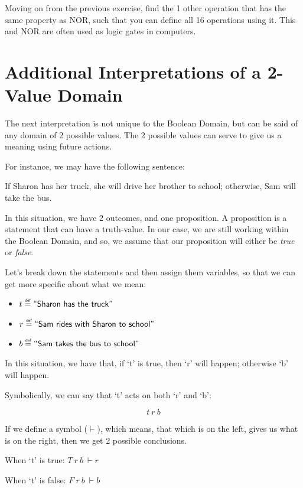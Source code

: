 \begin{exercise}
Moving on from the previous exercise, find the 1 other operation that has the same property as NOR, such that you can define all 16 operations using it. This and NOR are often used as logic gates in computers.
\end{exercise}

\section{Additional Interpretations of a 2-Value Domain}
The next interpretation is not unique to the Boolean Domain, but can be said of any domain of 2 possible values. The 2 possible values can serve to give us a meaning using future actions.

For instance, we may have the following sentence:
\begin{displayquote}
If Sharon has her truck, she will drive her brother to school; otherwise, Sam will take the bus.
\end{displayquote}

In this situation, we have 2 outcomes, and one \gls{proposition}. A proposition is a statement that can have a truth-value. In our case, we are still working within the Boolean Domain, and so, we assume that our proposition will either be \emph{true} or \emph{false}.

Let's break down the statements and then assign them variables, so that we can get more specific about what we mean:

\begin{samepage}
\begin{itemize}
    \item $t \defeq \textsf{``Sharon has the truck''}$
    \item $r \defeq \textsf{``Sam rides with Sharon to school''}$
    \item $b \defeq \textsf{``Sam takes the bus to school''}$
\end{itemize}
\end{samepage}

In this situation, we have that, if `t' is true, then `r' will happen; otherwise `b' will happen.

Symbolically, we can say that `t' acts on both `r' and `b':

$$
    t\ r\ b
$$
\begin{samepage}

If we define a symbol ($\vdash$), which means, that which is on the left, gives us what is on the right, then we get 2 possible conclusions.

When `t' is true: $T\ r\ b\ \vdash r$

When `t' is false: $F\ r\ b\ \vdash b$

\end{samepage}

